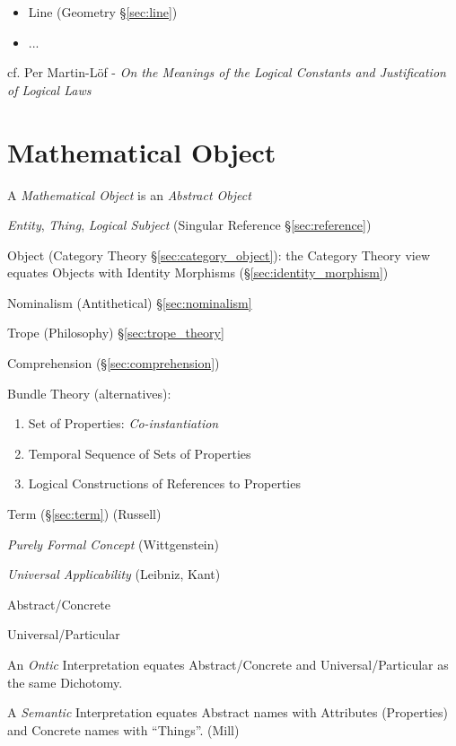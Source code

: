\begin{itemize}
  \item Line (Geometry \S\ref{sec:line})
  \item ...
\end{itemize}

cf. Per Martin-L\"of - \emph{On the Meanings of the Logical Constants and
  Justification of Logical Laws}



\section{Mathematical Object}\label{sec:mathematical_object}
\cite{laycock10}

A \emph{Mathematical Object} is an \emph{Abstract Object}

\emph{Entity}, \emph{Thing}, \emph{Logical Subject} (Singular
Reference \S\ref{sec:reference})

Object (Category Theory \S\ref{sec:category_object}): the Category
Theory view equates Objects with Identity Morphisms
(\S\ref{sec:identity_morphism})

Nominalism (Antithetical) \S\ref{sec:nominalism}

Trope (Philosophy) \S\ref{sec:trope_theory}

Comprehension (\S\ref{sec:comprehension})

Bundle Theory (alternatives):
\begin{enumerate}
  \item Set of Properties: \emph{Co-instantiation}
  \item Temporal Sequence of Sets of Properties
  \item Logical Constructions of References to Properties
\end{enumerate}

Term (\S\ref{sec:term}) (Russell)

\emph{Purely Formal Concept} (Wittgenstein)

\emph{Universal Applicability} (Leibniz, Kant)

Abstract/Concrete

Universal/Particular

An \emph{Ontic} Interpretation equates Abstract/Concrete and
Universal/Particular as the same Dichotomy.

A \emph{Semantic} Interpretation equates Abstract names with
Attributes (Properties) and Concrete names with ``Things''. (Mill)

